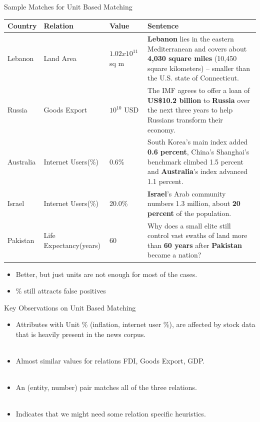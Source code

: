 \documentclass{beamer}
\begin{document}
\begin{frame}{Sample Matches for Unit Based Matching}


 \begin{table}
 \centering
 \tiny
 \begin{tabularx}{\textwidth}{|l|l|l|>{\raggedright}X|}
 \hline
 \textbf{Country} & \textbf{Relation} & \textbf{Value} & \textbf{Sentence}\tabularnewline
 \hline
 Lebanon & Land Area & $1.02 x 10^{11}$ sq m & \textbf{Lebanon} lies in the eastern Mediterranean and covers about \textbf{4,030 square miles} (10,450 square kilometers) -- smaller than the U.S. state of Connecticut.\tabularnewline
  \hline
  Russia & Goods Export & $ 10^{10}$ USD & The IMF agrees to offer a loan of \textbf{US\$10.2 billion} to \textbf{Russia} over the next three years to help Russians transform their economy.\tabularnewline
  \hline
  Australia & Internet Users(\%) & 0.6\% & South Korea's main index added \textbf{0.6 percent}, China's Shanghai's benchmark climbed 1.5 percent and \textbf{Australia}'s index advanced 1.1 percent.\tabularnewline
  \hline
  Israel & Internet Users(\%) & 20.0\% & \textbf{Israel}'s Arab community numbers 1.3 million, about \textbf{20 percent} of the population.\tabularnewline
  \hline
  Pakistan & Life Expectancy(years) & 60 & Why does a small elite still control vast swaths of land more than \textbf{60 years} after \textbf{Pakistan} became a nation?\tabularnewline
  \hline
 \end{tabularx}
 \end{table}
 \begin{itemize}
 \item Better, but just units are not enough for most of the cases. 
  \item \% still attracts false positives
 \end{itemize}

 \end{frame}

\begin{frame}{Key Observations on Unit Based Matching}
 
 \begin{itemize}
  \item Attributes with Unit \% (inflation, internet user \%), are affected by stock data that is heavily present in the news corpus.\\~\\
  \item Almost similar values for relations FDI, Goods Export, GDP.\\~\\
  \item An (entity, number) pair matches all of the three relations. \\~\\
  \item Indicates that we might need some relation specific heuristics. \\~\\
 \end{itemize}

 
\end{frame}
\end{document}
